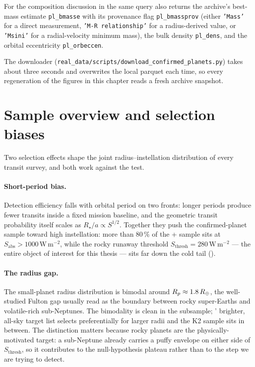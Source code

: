 For the composition discussion in  the same
query also returns the archive's best-mass estimate \texttt{pl\_bmasse}
with its provenance flag \texttt{pl\_bmassprov} (either
\texttt{'Mass'} for a direct measurement, \texttt{'M-R relationship'}
for a radius-derived value, or \texttt{'Msini'} for a radial-velocity
minimum mass), the bulk density \texttt{pl\_dens}, and the orbital
eccentricity \texttt{pl\_orbeccen}.

The downloader
(\texttt{real\_data/scripts/download\_confirmed\_planets.py}) takes
about three seconds and overwrites the local parquet each time, so
every regeneration of the figures in this chapter reads a fresh
archive snapshot.


\section{Sample overview and selection biases}
\label{sec:kt_sample_overview}

Two selection effects shape the joint radius--instellation
distribution of every transit survey, and both work against the
\HZIED test.

\paragraph{Short-period bias.}
Detection efficiency falls with orbital period on two fronts: longer
periods produce fewer transits inside a fixed mission baseline, and
the geometric transit probability itself scales as $R_\star / a
\propto S^{1/2}$.  Together they push the confirmed-planet sample
toward high instellation: more than $80\,\%$ of the \Kepler{}+\TESS{}
sample sits at $S_\mathrm{abs} > 1000\,\mathrm{W\,m^{-2}}$, while the
rocky runaway threshold $S_\mathrm{thresh} = 280\,\mathrm{W\,m^{-2}}$
--- the entire object of interest for this thesis --- sits far down
the cold tail ().

\paragraph{The radius gap.}
The small-planet radius distribution is bimodal around
$R_p \approx 1.8\,R_{\oplus}$, the well-studied Fulton gap
\parencite{Fulton2017} usually read as the boundary between rocky
super-Earths and volatile-rich sub-Neptunes.  The bimodality is
clean in the \Kepler subsample; \TESS' brighter, all-sky target list
selects preferentially for larger radii and the K2 sample sits in
between.  The distinction matters because rocky planets are the
physically-motivated \HZIED target: a sub-Neptune already carries a
puffy envelope on either side of $S_\mathrm{thresh}$, so it
contributes to the null-hypothesis plateau rather than to the step
we are trying to detect.

